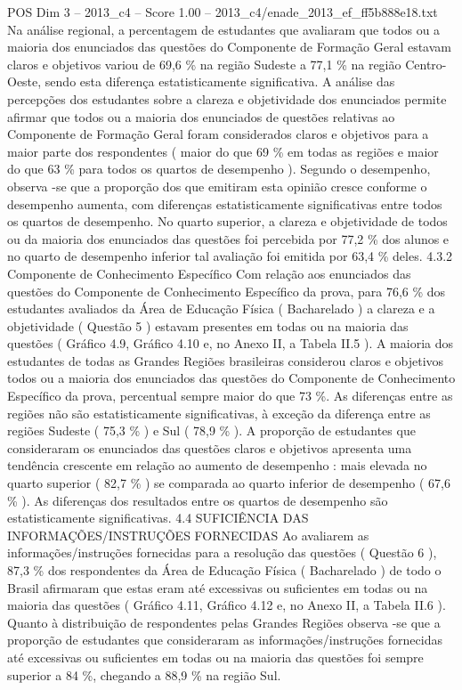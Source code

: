 \begin{textsample}{POS Dim 3 – 2013\_c4 – Score 1.00 – 2013\_c4/enade\_2013\_ef\_ff5b888e18.txt}
Na análise regional, a percentagem de estudantes que avaliaram que todos ou a maioria dos enunciados das questões do Componente de Formação Geral estavam claros e objetivos variou de 69,6 \% na região Sudeste a 77,1 \% na região Centro-Oeste, sendo esta diferença estatisticamente significativa.
A análise das percepções dos estudantes sobre a clareza e objetividade dos enunciados permite afirmar que todos ou a maioria dos enunciados de questões relativas ao Componente de Formação Geral foram considerados claros e objetivos para a maior parte dos respondentes ( maior do que 69 \% em todas as regiões e maior do que 63 \% para todos os quartos de desempenho ).
Segundo o desempenho, observa -se que a proporção dos que emitiram esta opinião cresce conforme o desempenho aumenta, com diferenças estatisticamente significativas entre todos os quartos de desempenho.
No quarto superior, a clareza e objetividade de todos ou da maioria dos enunciados das questões foi percebida por 77,2 \% dos alunos e no quarto de desempenho inferior tal avaliação foi emitida por 63,4 \% deles. 4.3.2 Componente de Conhecimento Específico Com relação aos enunciados das questões do Componente de Conhecimento Específico da prova, para 76,6 \% dos estudantes avaliados da Área de Educação Física ( Bacharelado ) a clareza e a objetividade ( Questão 5 ) estavam presentes em todas ou na maioria das questões ( Gráfico 4.9, Gráfico 4.10 e, no Anexo II, a Tabela II.5 ).
A maioria dos estudantes de todas as Grandes Regiões brasileiras considerou claros e objetivos todos ou a maioria dos enunciados das questões do Componente de Conhecimento Específico da prova, percentual sempre maior do que 73 \%.
As diferenças entre as regiões não são estatisticamente significativas, à exceção da diferença entre as regiões Sudeste ( 75,3 \% ) e Sul ( 78,9 \% ).
A proporção de estudantes que consideraram os enunciados das questões claros e objetivos apresenta uma tendência crescente em relação ao aumento de desempenho : mais elevada no quarto superior ( 82,7 \% ) se comparada ao quarto inferior de desempenho ( 67,6 \% ).
As diferenças dos resultados entre os quartos de desempenho são estatisticamente significativas. 4.4 SUFICIÊNCIA DAS INFORMAÇÕES/INSTRUÇÕES FORNECIDAS Ao avaliarem as informações/instruções fornecidas para a resolução das questões ( Questão 6 ), 87,3 \% dos respondentes da Área de Educação Física ( Bacharelado ) de todo o Brasil afirmaram que estas eram até excessivas ou suficientes em todas ou na maioria das questões ( Gráfico 4.11, Gráfico 4.12 e, no Anexo II, a Tabela II.6 ).
Quanto à distribuição de respondentes pelas Grandes Regiões observa -se que a proporção de estudantes que consideraram as informações/instruções fornecidas até excessivas ou suficientes em todas ou na maioria das questões foi sempre superior a 84 \%, chegando a 88,9 \% na região Sul.

\end{textsample}
